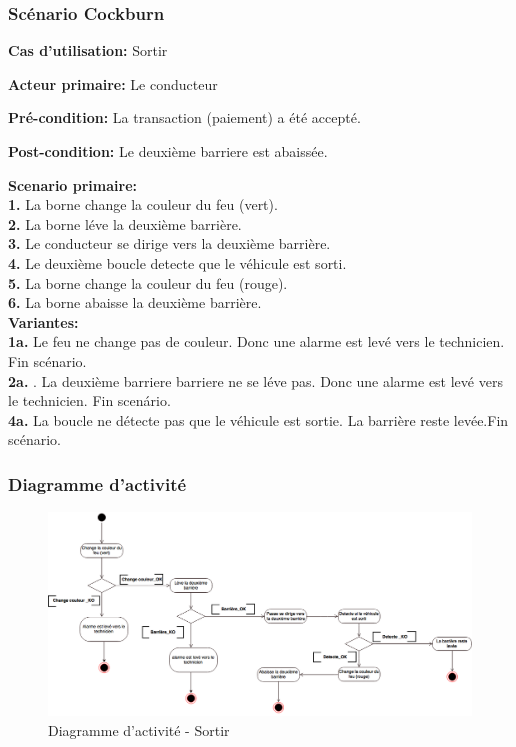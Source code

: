 \subsubsection{Scénario Cockburn}
\textbf{Cas d'utilisation:} Sortir

\textbf{Acteur primaire:}  Le conducteur

\textbf{Pré-condition:} La transaction (paiement) a été accepté.

 
\textbf{Post-condition:} Le deuxième barriere est abaissée. 

\textbf{Scenario primaire: } \\
    \textbf{1.}  La borne change la couleur du feu (vert). \\
    \textbf{2.} La borne léve la deuxième barrière. \\
    \textbf{3.} Le conducteur se dirige vers la deuxième barrière.\\
    \textbf{4.} Le deuxième boucle detecte que le véhicule est sorti.\\ 
    \textbf{5.}  La borne change la couleur du feu (rouge).\\
    \textbf{6.}  La borne abaisse la deuxième barrière. \\

\textbf{Variantes:}\\
    \textbf{1a.} Le feu ne change pas de couleur. Donc une alarme est levé vers le technicien. Fin scénario.\\
    \textbf{2a.}  . La deuxième barriere barriere ne se léve pas. Donc une alarme est levé vers le technicien. Fin scenário.\\
    \textbf{4a.}  La boucle ne détecte pas que le véhicule est sortie. La barrière reste levée.Fin scénario.\\
\newpage    
\subsubsection{Diagramme d'activité}
\begin{figure}[!htb]
    \centering
    \includegraphics[scale=0.4, angle = 90]{02_Desenvolvimento/TD2/images/DASortir.png}
    \caption{Diagramme d'activité - Sortir}
    \label{fig:DARentrer}
\end{figure}
\newpage    
